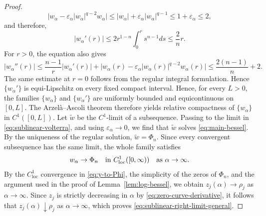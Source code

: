 \documentclass[11pt]{article}
\begin{document}
\begin{proof}
\begin{equation*}
\big|w_\alpha-\varepsilon_\alpha
|w_\alpha|^{q-2}w_\alpha\big|\leq |w_\alpha|+\varepsilon_\alpha|w_\alpha|^{q-1}\leq 1+\varepsilon_\alpha\leq2,
\end{equation*}
and therefore,
\begin{equation*}
|w_\alpha'(r)|\leq
2r^{1-n}\int_0^r s^{n-1}ds\leq \frac{2}{n}r.
\end{equation*}
{For $r>0$, the equation also gives
\[
 |w_\alpha''(r)|
 \le \frac{n-1}{r}|w_\alpha'(r)|
 +\bigl|w_\alpha(r)-\varepsilon_\alpha
 |w_\alpha(r)|^{q-2}w_\alpha(r)\bigr|
 \le \frac{2(n-1)}{n}+2.
\]
The same estimate at $r=0$ follows from the regular integral
formulation. Hence $\{w_\alpha'\}$ is equi-Lipschitz on every fixed
compact interval.}
Hence, for every
$L>0$, the families $\{w_\alpha\}$ and $\{w_\alpha'\}$ are uniformly
bounded and equicontinuous on $[0,L]$. The Arzel\`{a}--Ascoli theorem
therefore yields relative compactness of $\{w_\alpha\}$ in
$C^1([0,L])$. Let $\tilde w$ be the $C^1$-limit of
a subsequence. Passing to the limit in \eqref{eq:sublinear-volterra}, and using
$\varepsilon_{\alpha}\to0$, we find that $\tilde w$ solves \eqref{eq:main-bessel}. By the uniqueness of the regular solution, $\tilde w=\Phi_n$. Since every convergent subsequence has the same limit, the whole family satisfies
\begin{equation}\label{eq:y-to-Phi}
w_\alpha\rightarrow\Phi_n\quad \text{in }C^1_{\rm loc}([0,\infty)){\quad\text{as }\alpha\to\infty}.
\end{equation}
By the $C^1_{\mathrm{loc}}$ convergence in \eqref{eq:y-to-Phi}, the simplicity of the zeros of $\Phi_n$, and the argument used in the proof of Lemma~\ref{lem:log-bessel}, we obtain
 $z_j(\alpha)\rightarrow\rho_j$ as $\alpha\to\infty$. Since $z_j$ is strictly decreasing in $\alpha$ by \eqref{eq:zero-curve-derivative}, it follows that $z_j(\alpha)\downarrow\rho_j$ as $\alpha\to\infty$,
which proves \eqref{eq:sublinear-right-limit-general}.


\end{proof}
\end{document}
